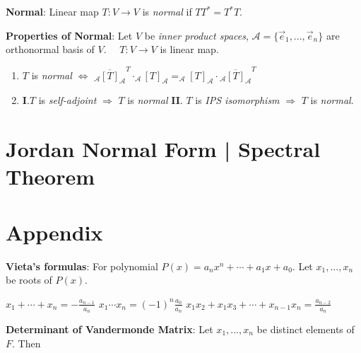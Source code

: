 \documentclass[9pt]{article}
\begin{document}
\textbf{Normal}: Linear map $T:V\to V$ is \textit{normal} if $TT^*=T^*T$.

\textbf{Properties of Normal}: Let $V$ be \textit{inner product spaces}, $\mathcal{A}=\{\vec{e}_1,...,\vec{e}_n\}$ are orthonormal basis of $V$. \ \ $T:V\to V$ is linear map.

\begin{enumerate}[itemsep=-2pt, topsep=-2pt]
    \item $T$ is \textit{normal} $\Leftrightarrow$ $\overline{_{\mathcal{A}}[T]_{\mathcal{A}}}^T\cdot_{\mathcal{A}}[T]_{\mathcal{A}}=_{\mathcal{A}}[T]_{\mathcal{A}}\cdot\overline{_{\mathcal{A}}[T]_{\mathcal{A}}}^T$
    \item \textbf{I}.$T$ is \textit{self-adjoint} $\Rightarrow$ $T$ is \textit{normal} \qquad \textbf{II}. $T$ is \textit{IPS isomorphism} $\Rightarrow$ $T$ is \textit{normal}.
\end{enumerate}


\section{Jordan Normal Form | Spectral Theorem} %


\section{Appendix} %

\textbf{Vieta's formulas}: For polynomial $P(x)=a_nx^n+\cdots+a_1x+a_0$. \quad Let $x_1,...,x_n$ be roots of $P(x)$.

\qquad  $x_1+\cdots+x_n=-\frac{a_{n-1}}{a_n}$ \quad $x_1\cdots x_n=(-1)^n\frac{a_0}{a_n}$ \quad $x_1x_2+x_1x_3+\cdots+x_{n-1}x_n=\frac{a_{n-2}}{a_n}$

\vspace{-13pt}
\textbf{Determinant of Vandermonde Matrix}: Let $x_1,...,x_n$ be distinct elements of $F$. \quad Then 
\vspace{-13pt}
\end{document}
